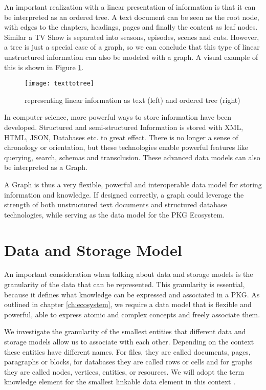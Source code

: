 An important realization with a linear presentation of information is that it can be interpreted as an ordered tree. A text document can be seen as the root node, with edges to the chapters, headings, pages and finally the content as leaf nodes. Similar a TV Show is separated into seasons, episodes, scenes and cuts. However, a tree is just a special case of a graph, so we can conclude that this type of linear unstructured information can also be modeled with a graph. A visual example of this is shown in Figure \ref{fig:texttotree}.

\begin{figure}[h]
\centering
\texttt{[image: texttotree]}
\caption{representing linear information as text (left) and ordered tree (right)}
\label{fig:texttotree}
\end{figure}

In computer science, more powerful ways to store information have been developed. Structured and semi-structured Information is stored with XML, HTML, JSON, Databases etc. to great effect. There is no longer a sense of chronology or orientation, but these technologies enable powerful features like querying, search, schemas and transclusion. These advanced data models can also be interpreted as a Graph.

A Graph is thus a very flexible, powerful and interoperable data model for storing information and knowledge. If designed correctly, a graph could leverage the strength of both unstructured text documents and structured database technologies, while serving as the data model for the PKG Ecosystem.

\section{Data and Storage Model}

An important consideration when talking about data and storage models is the granularity of the data that can be represented. This granularity is essential, because it defines what knowledge can be expressed and associated in a PKG. As outlined in chapter \ref{ch:ecosystem}, we require a data model that is flexible and powerful, able to express atomic and complex concepts and freely associate them.

We investigate the granularity of the smallest entities that different data and storage models allow us to associate with each other. Depending on the context these entities have different names. For files, they are called documents, pages, paragraphs or blocks, for databases they are called rows or cells and for graphs they are called nodes, vertices, entities, or resources. We will adopt the term knowledge element for the smallest linkable data element in this context \cite{Davies2005Memex60}. 

